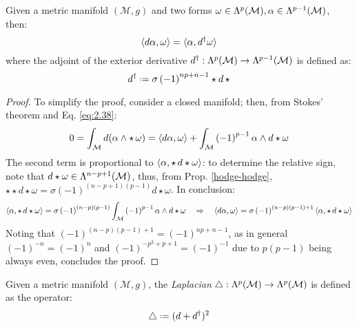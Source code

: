 \begin{proposition}
  Given a metric manifold $ (\mathcal{M},g) $ and two forms $ \omega \in \Lambda^{p}(\mathcal{M}), \alpha \in \Lambda^{p-1}(\mathcal{M}) $, then:
  \begin{equation}
    \braket{d\alpha,\omega} = \braket{\alpha,d^{\dagger}\omega}
    \label{eq:3.19}
  \end{equation}
  where the adjoint of the exterior derivative $ d^{\dagger} : \Lambda^{p}(\mathcal{M}) \rightarrow \Lambda^{p-1}(\mathcal{M}) $ is defined as:
  \begin{equation}
    d^{\dagger} \defeq \sigma \left( -1 \right)^{np + n -1} \star d \, \star
    \label{eq:3.20}
  \end{equation}
\end{proposition}
\begin{proof}
  To simplify the proof, consider a closed manifold; then, from Stokes' theorem and Eq. \ref{eq:2.38}:
  \begin{equation*}
    0 = \int_{\mathcal{M}} d ( \alpha \wedge \star\, \omega ) = \braket{d\alpha, \omega} + \int_{\mathcal{M}} \left( -1 \right)^{p-1} \alpha \wedge d \star \omega
  \end{equation*}
  The second term is proportional to $ \braket{\alpha, \star\, d \star \omega} $: to determine the relative sign, note that $ d \star \omega \in \Lambda^{n-p+1}(\mathcal{M}) $, thus, from Prop. \ref{hodge-hodge}, $ \star \star d \star \omega = \sigma \left( -1 \right)^{(n-p+1)(p-1)} d \star \omega $. In conclusion:
  \begin{equation*}
    \braket{\alpha, \star\, d \star \omega} = \sigma \left( -1 \right)^{(n-p)(p-1)} \int_{\mathcal{M}} \left( -1 \right)^{p-1} \alpha \wedge d \star \omega
    \quad \Rightarrow \quad
    \braket{d\alpha, \omega} = \sigma \left( -1 \right)^{(n-p)(p-1) + 1} \braket{\alpha, \star\, d \star \omega}
  \end{equation*}
  Noting that $ \left( -1 \right)^{(n-p)(p-1) + 1} = \left( -1 \right)^{np + n - 1} $, as in general $ \left( -1 \right)^{-n} = \left( -1 \right)^n $ and $ \left( -1 \right)^{-p^2 + p + 1} = \left( -1 \right)^{-1} $ due to $ p (p-1) $ being always even, concludes the proof.
\end{proof}

\begin{definition}
  Given a metric manifold $ (\mathcal{M},g) $, the \textit{Laplacian} $ \triangle : \Lambda^{p}(\mathcal{M}) \rightarrow \Lambda^{p}(\mathcal{M}) $ is defined as the operator:
  \begin{equation}
    \lap \defeq ( d + d^{\dagger} )^2
    \label{eq:3.21}
  \end{equation}
\end{definition}

